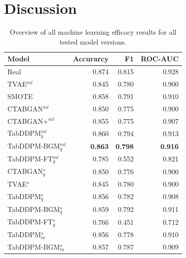 \section{Discussion}
\label{ch:results-discussion}

\begin{table}[h]
	\centering
	\begin{tabular}{lrrr}
		\toprule
		\textbf{Model}       & \textbf{Accurarcy} & \textbf{F1}     & \textbf{ROC-AUC} \\
		\midrule
		Real                 & 0.874              & 0.815           & 0.928            \\
		TVAE$^{ml}$          & 0.845              & 0.780           & 0.900            \\
		SMOTE                & 0.858              & 0.791           & 0.910            \\
		CTABGAN$^{ml}$       & 0.850              & 0.775           & 0.900            \\
		CTABGAN+$^{ml}$      & 0.855              & 0.775           & 0.907            \\
		TabDDPM$^{ml}_q$     & 0.860              & 0.794           & 0.913            \\
		TabDDPM-BGM$^{ml}_q$ & \textbf{0.863}     & \textbf{0.798} & \textbf{0.916}   \\
		TabDDPM-FT$^{ml}_q$  & 0.785              & 0.552           & 0.821            \\
		CTABGAN$^{s}_q$      & 0.850              & 0.776           & 0.900            \\
		TVAE$^{s}$           & 0.845              & 0.780           & 0.900            \\
		TabDDPM$^{s}_q$      & 0.856              & 0.782           & 0.908            \\
		TabDDPM-BGM$^{s}_q$  & 0.859              & 0.792           & 0.911            \\
		TabDDPM-FT$^{s}_q$   & 0.766              & 0.451           & 0.712            \\
		TabDDPM$^{s}_m$      & 0.856              & 0.778           & 0.910            \\
		TabDDPM-BGM$^{s}_m$  & 0.857              & 0.787           & 0.909            \\
		\bottomrule
	\end{tabular}
	\caption[]{Overview of all machine learning efficacy results for all tested model versions.}
	\label{tab:ml-all}
\end{table}


